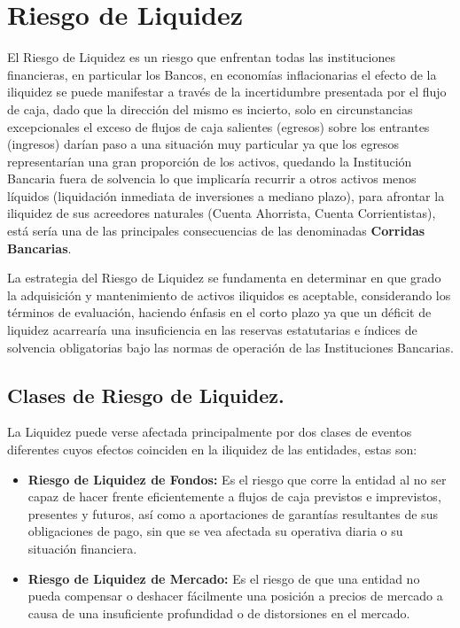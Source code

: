 \documentclass[]{article}
\begin{document}
\hypertarget{riesgo-de-liquidez}{%
\section{Riesgo de Liquidez}\label{riesgo-de-liquidez}}

El Riesgo de Liquidez es un riesgo que enfrentan todas las instituciones
financieras, en particular los Bancos, en economías inflacionarias el
efecto de la iliquidez se puede manifestar a través de la incertidumbre
presentada por el flujo de caja, dado que la dirección del mismo es
incierto, solo en circunstancias excepcionales el exceso de flujos de
caja salientes (egresos) sobre los entrantes (ingresos) darían paso a
una situación muy particular ya que los egresos representarían una gran
proporción de los activos, quedando la Institución Bancaria fuera de
solvencia lo que implicaría recurrir a otros activos menos líquidos
(liquidación inmediata de inversiones a mediano plazo), para afrontar la
iliquidez de sus acreedores naturales (Cuenta Ahorrista, Cuenta
Corrientistas), está sería una de las principales consecuencias de las
denominadas \textbf{Corridas Bancarias}.

La estrategia del Riesgo de Liquidez se fundamenta en determinar en que
grado la adquisición y mantenimiento de activos iliquidos es aceptable,
considerando los términos de evaluación, haciendo énfasis en el corto
plazo ya que un déficit de liquidez acarrearía una insuficiencia en las
reservas estatutarias e índices de solvencia obligatorias bajo las
normas de operación de las Instituciones Bancarias.

\hypertarget{clases-de-riesgo-de-liquidez.}{%
\subsection{\texorpdfstring{\textbf{Clases de Riesgo de
Liquidez.}}{Clases de Riesgo de Liquidez.}}\label{clases-de-riesgo-de-liquidez.}}

La Liquidez puede verse afectada principalmente por dos clases de
eventos diferentes cuyos efectos coinciden en la iliquidez de las
entidades, estas son:

\begin{itemize}
\item
  \textbf{Riesgo de Liquidez de Fondos:} Es el riesgo que corre la
  entidad al no ser capaz de hacer frente eficientemente a flujos de
  caja previstos e imprevistos, presentes y futuros, así como a
  aportaciones de garantías resultantes de sus obligaciones de pago, sin
  que se vea afectada su operativa diaria o su situación financiera.
\item
  \textbf{Riesgo de Liquidez de Mercado:} Es el riesgo de que una
  entidad no pueda compensar o deshacer fácilmente una posición a
  precios de mercado a causa de una insuficiente profundidad o de
  distorsiones en el mercado.
\end{itemize}
\end{document}
